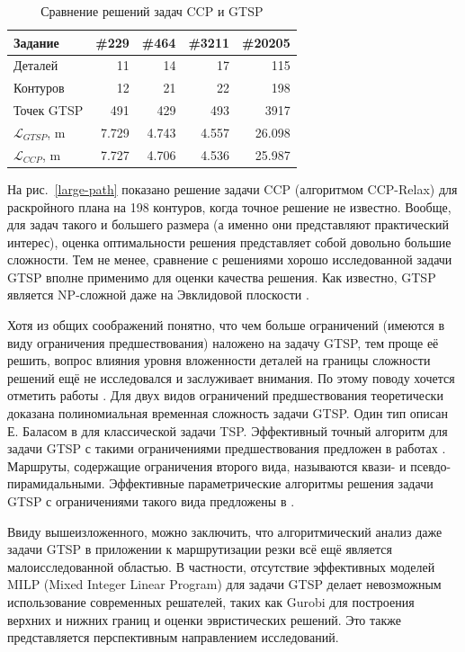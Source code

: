 \documentclass[10pt]{SPIIRAS_Proceedings}
\begin{document}
\begin{table}[h]
  \begin{center}
  \begin{tabular}{l*{4}{|r}}
      Задание & \#229 & \#464 & \#3211 & \#20205 \\
      \hline \hline
      Деталей & 11 & 14 & 17 & 115 \\
      \hline
      Контуров & 12 & 21 & 22 & 198 \\
      \hline
      Точек GTSP & 491 & 429 & 493 & 3917 \\
      \hline
      $\mathcal L_{GTSP}$, m & 7.729 & 4.743 & 4.557 & 26.098 \\
      \hline
      $\mathcal L_{CCP}$, m & 7.727 & 4.706 & 4.536 & 25.987 \\
      \hline
  \end{tabular}
  \caption{Сравнение решений задач CCP и GTSP}
  \label{ccp-vs-gtsp}
  \end{center}
\end{table}

На рис.~\ref{large-path}
показано решение задачи CCP
(алгоритмом CCP-Relax)
для раскройного плана на 198 контуров,
когда точное решение не известно.
Вообще,
для задач такого и большего размера
(а именно они представляют практический интерес),
оценка оптимальности решения
представляет собой довольно большие сложности.
Тем не менее,
сравнение с решениями
хорошо исследованной задачи GTSP
вполне применимо для оценки качества решения.
Как известно,
GTSP является NP-сложной
даже на Эвклидовой плоскости
\cite{bib:x103}.

Хотя из общих соображений понятно,
что чем больше ограничений
(имеются в виду ограничения предшествования)
наложено на задачу GTSP,
тем проще её решить,
вопрос влияния уровня вложенности деталей
на границы сложности решений ещё
не исследовался и заслуживает внимания.
По этому поводу хочется отметить работы
\cite{bib:x104,bib:x105}.
Для двух видов ограничений предшествования
теоретически доказана полиномиальная временная сложность
задачи GTSP.
Один тип описан Е. Баласом в
\cite{bib:x100}
для классической задачи TSP.
Эффективный точный алгоритм для задачи GTSP
с такими ограничениями предшествования
предложен в работах
\cite{bib:x102,ChentsovIII}.
Маршруты,
содержащие ограничения второго вида,
называются квази- и псевдо-пирамидальными.
Эффективные параметрические алгоритмы
решения задачи GTSP
с ограничениями такого вида предложены в
\cite{KhachaiI,KhachayII}.

Ввиду вышеизложенного,
можно заключить,
что алгоритмический анализ
даже задачи GTSP
в приложении к маршрутизации резки
всё ещё является малоисследованной областью.
В частности,
отсутствие эффективных моделей
MILP (Mixed Integer Linear Program)
для задачи GTSP
делает невозможным использование
современных решателей,
таких как Gurobi
\cite{bib:x101}
для построения верхних и нижних границ
и оценки эвристических решений.
Это также представляется перспективным
направлением исследований.
\end{document}
